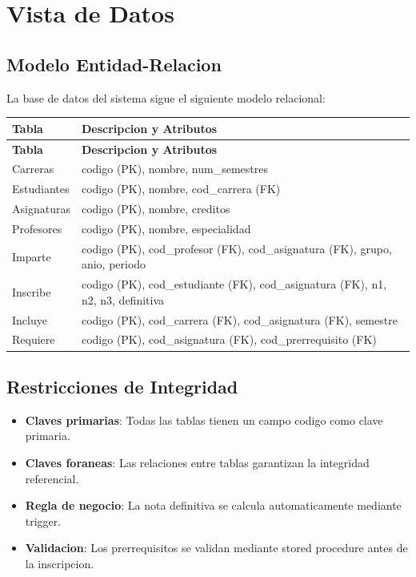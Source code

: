 \documentclass[12pt,a4paper]{article}
\begin{document}
\section{Vista de Datos}

\subsection{Modelo Entidad-Relacion}

La base de datos del sistema sigue el siguiente modelo relacional:

\begin{longtable}{|p{3cm}|p{11cm}|}
\hline
\rowcolor{udgreen!20}
\textbf{Tabla} & \textbf{Descripcion y Atributos} \\
\hline
\endfirsthead
\hline
\rowcolor{udgreen!20}
\textbf{Tabla} & \textbf{Descripcion y Atributos} \\
\hline
\endhead
Carreras & codigo (PK), nombre, num\_semestres \\
\hline
Estudiantes & codigo (PK), nombre, cod\_carrera (FK) \\
\hline
Asignaturas & codigo (PK), nombre, creditos \\
\hline
Profesores & codigo (PK), nombre, especialidad \\
\hline
Imparte & codigo (PK), cod\_profesor (FK), cod\_asignatura (FK), grupo, anio, periodo \\
\hline
Inscribe & codigo (PK), cod\_estudiante (FK), cod\_asignatura (FK), n1, n2, n3, definitiva \\
\hline
Incluye & codigo (PK), cod\_carrera (FK), cod\_asignatura (FK), semestre \\
\hline
Requiere & codigo (PK), cod\_asignatura (FK), cod\_prerrequisito (FK) \\
\hline
\end{longtable}

\subsection{Restricciones de Integridad}

\begin{itemize}
    \item \textbf{Claves primarias}: Todas las tablas tienen un campo codigo como clave primaria.
    \item \textbf{Claves foraneas}: Las relaciones entre tablas garantizan la integridad referencial.
    \item \textbf{Regla de negocio}: La nota definitiva se calcula automaticamente mediante trigger.
    \item \textbf{Validacion}: Los prerrequisitos se validan mediante stored procedure antes de la inscripcion.
\end{itemize}
\end{document}
